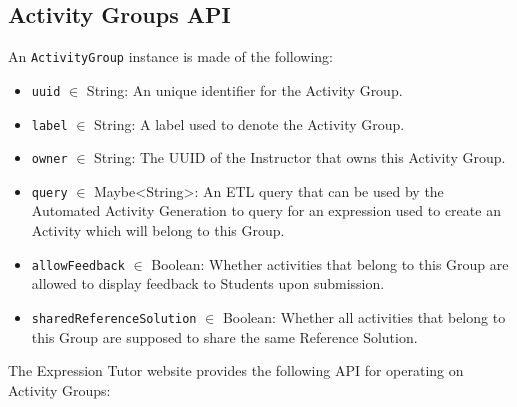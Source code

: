 \begin{chapterBody}

\section{Activity Groups API}

An \texttt{ActivityGroup} instance is made of the following:
\begin{itemize}
    \item \texttt{uuid} $ \in $ String: An unique identifier for the Activity 
Group.
    \item \texttt{label} $ \in $ String: A label used to denote the Activity 
Group.
    \item \texttt{owner} $ \in $ String: The UUID of the Instructor that owns
this Activity Group.
    \item \texttt{query} $ \in $ Maybe<String>: An ETL query that can be used 
by the Automated Activity Generation to query for an expression used to create 
an Activity which will belong to this Group.
    \item \texttt{allowFeedback} $ \in $ Boolean: Whether activities that 
belong to this Group are allowed to display feedback to Students upon 
submission.
    \item \texttt{sharedReferenceSolution} $ \in $ Boolean: Whether all 
activities that belong to this Group are supposed to share the same Reference
Solution.
\end{itemize}

\noindent The Expression Tutor website provides the following API for operating 
on Activity Groups:


\end{chapterBody}
